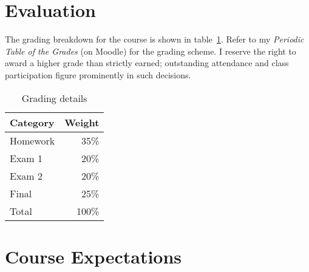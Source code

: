 \documentclass[11pt]{article}
\begin{document}
\section{Evaluation}

The grading breakdown
for the course
is shown in table~\ref{tab:grading}.
Refer to my \emph{Periodic Table of the Grades} (on Moodle) for the grading scheme. I reserve
the right to award a higher grade than strictly earned; outstanding attendance and class
participation figure prominently in such decisions.

\begin{table}[htb]
  \centering
  \begin{tabular}{lr}
    \toprule
    Category & Weight \\
    \midrule
    Homework & 35\%   \\
    Exam 1   & 20\%   \\
    Exam 2   & 20\%   \\
    Final    & 25\%   \\
    \midrule
    Total    & 100\%  \\
    \bottomrule
  \end{tabular}
  \caption{Grading details}
  \label{tab:grading}
\end{table}

\begin{comment}
  #+ORGTBL: SEND grades orgtbl-to-latex :booktabs t
  | Category | Weight |
  |----------+--------|
  | <l>      |    <r> |
  | Homework |    35%
  | Exam 1   |    20%
  | Exam 2   |    20%
  | Final    |    25%
  |----------+--------|
  | Total    |   100%
\end{comment}

\section{Course Expectations}



\printbibliography{}
\end{document}
